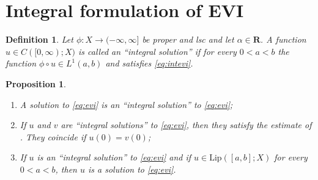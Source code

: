 \documentclass[a4paper,11pt, leqno]{scrreprt} %
\newcommand{\R}{\mathbf R}
\theoremstyle{change}
\newcounter{acounter}[chapter]
\newtheorem{definition}[acounter]{Definition}
\newtheorem{proposition}[acounter]{Proposition}
\theoremstyle{nonumberplain}
\begin{document}
\section{Integral formulation of EVI}
\begin{definition}
Let $\phi : X \to (-\infty, \infty]$ be proper and lsc and let $\alpha
\in \R$. A function $u \in C([0, \infty); X)$ is called an ``integral
solution'' if for every $0 < a < b$ the function $\phi \circ u \in
L^1(a,b)$ and satisfies \eqref{eq:intevi}.
\end{definition}

\begin{proposition}\label{prop:intform}
\mbox{}
\begin{enumerate}
  \item \label{it:intevi1} A solution to \ref{eq:evi} is an ``integral solution'' to
    \ref{eq:evi};
  \item \label{it:intevi2} If $u$ and $v$ are ``integral solutions'' to \ref{eq:evi},
    then they satisfy the estimate of . They coincide
    if $u(0) = v(0)$;
  \item \label{it:intevi3} If $u$ is an ``integral solution'' to \ref{eq:evi} and if $u
    \in \text{Lip}([a,b]; X)$ for every $0 < a < b$, then $u$ is a
    solution to \ref{eq:evi}.
\end{enumerate}
\end{proposition}
\end{document}
